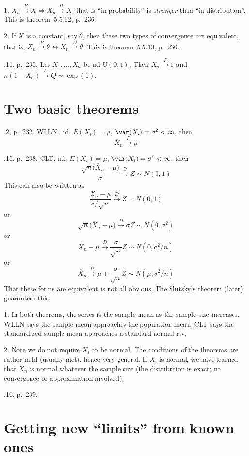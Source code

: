 \documentclass[12pt]{article}
\begin{document}
\alert
1. $X_n \xrightarrow{\;P\;} X \Rightarrow
    X_n \xrightarrow{\;D\;} X$, that is
    ``in probability'' is \emph{stronger}
    than ``in distribution''.
    This is theorem~5.5.12, p.~236.

2. If $X$ is a constant, say $\theta$, then
    these two types of convergence are equivalent,
    that is,
   $X_n \xrightarrow{\;P\;} \theta \Longleftrightarrow
    X_n \xrightarrow{\;D\;} \theta$.
    This is theorem~5.5.13, p.~236.

.11, p.~235.
Let $X_1,\dotsc,X_n$ be iid $\text{U}(0,1)$. Then
$X_{n} \xrightarrow{\;P\;} 1$
and $n(1 - X_{n}) \xrightarrow{\;D\;} Q \sim \exp(1)$.

\section{Two basic theorems}

.2, p.~232. WLLN.
iid, $E(X_i) = \mu$, $\var(X_i) = \sigma^2 < \infty$, then
\[
\overline{X}_n \xrightarrow{\;P\;} \mu
\]

.15, p.~238. CLT.
iid, $E(X_i) = \mu$, $\var(X_i) = \sigma^2 < \infty$, then
\[
\frac{\sqrt{n}\bigl(\overline{X}_n - \mu\bigr)}{\sigma}
\xrightarrow{\;D\;} Z \sim N(0,1)
\]
This can also be written as
\[
\frac{\overline{X}_n - \mu}{\sigma/\sqrt{n}}
    \xrightarrow{\;D\;} Z \sim N(0, 1)
\]
or
\[
\sqrt{n}\bigl(\overline{X}_n - \mu\bigr)
    \xrightarrow{\;D\;} \sigma Z \sim N(0, \sigma^2)
\]
or
\[
\overline{X}_n - \mu
    \xrightarrow{\;D\;} \frac{\sigma}{\sqrt{n}} Z \sim N(0, \sigma^2/n)
\]
or
\[
\overline{X}_n
    \xrightarrow{\;D\;}
        \mu + \frac{\sigma}{\sqrt{n}} Z
        \sim N(\mu, \sigma^2/n)
\]
That these forms are equivalent
is not all obvious.
The Slutsky's theorem (later) guarantees this.

\alert
1.
In both theorems,
the series is the sample mean as the sample size increases.
WLLN says the sample mean approaches the population mean;
CLT says the standardized sample mean approaches a
standard normal r.v.

2.
Note we do not require $X_i$ to be normal.
The conditions of the theorems are rather mild
(usually met), hence very general.
If $X_i$ is normal, we have learned that
$\overline{X}_n$ is normal whatever the sample size
(the distribution is exact; no convergence or approximation involved).

.16, p.~239.

\section{Getting new ``limits'' from known ones}
\end{document}
